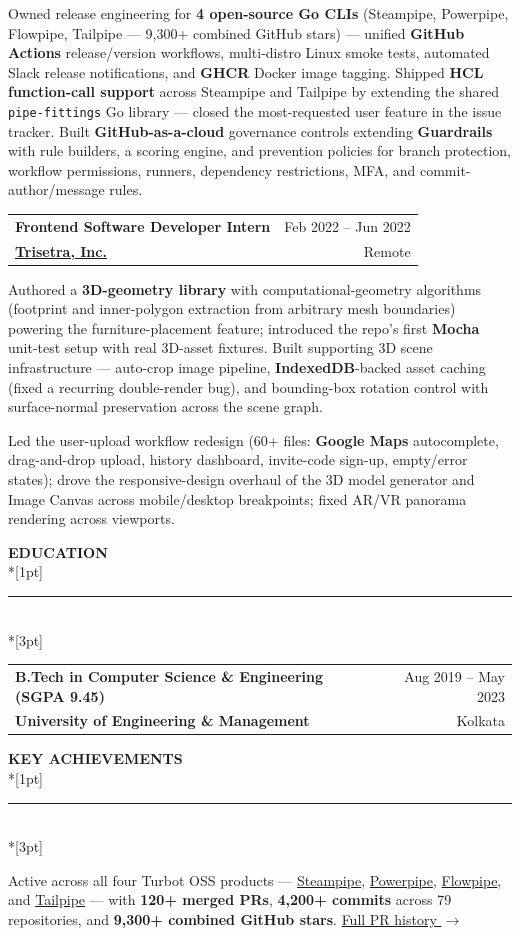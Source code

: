 \documentclass[10pt,letterpaper]{article}
\makeatletter
\newcommand{\rsection}[1]{%
  \vspace{0.85em}%
  {\color{primary}\fontsize{10.5pt}{12pt}\bfseries\selectfont\MakeUppercase{#1}}\\*[1pt]%
  \textcolor{rulec}{\rule{\linewidth}{0.4pt}}\\*[3pt]%
  \nobreak%
}
\newcommand{\role}[4]{%
  \vspace{-4pt}%
  \begin{tabular*}{\linewidth}[t]{@{}l@{\extracolsep{\fill}}r@{}}
    {\fontsize{10pt}{11.5pt}\bfseries\color{header}\selectfont #1} & {\color{muted}\small #4} \\[1pt]
    {\fontsize{9.5pt}{11pt}\bfseries\color{primary}\selectfont #2} & {\color{muted}\small #3} \\
  \end{tabular*}%
  \par\vspace{-4pt}%
}
\let\olditemize\itemize
\let\endolditemize\enditemize
\renewenvironment{itemize}
  {\olditemize\setlength{\itemsep}{2pt}\setlength{\parsep}{0pt}\setlength{\topsep}{1pt}\setlength{\partopsep}{0pt}\setlength{\leftmargin}{1.2em}}
  {\endolditemize}
\makeatother
\begin{document}
\begin{itemize}
\item Owned release engineering for \textbf{4 open-source Go CLIs} (Steampipe, Powerpipe, Flowpipe, Tailpipe --- 9,300+ combined GitHub stars) --- unified \textbf{GitHub Actions} release/version workflows, multi-distro Linux smoke tests, automated Slack release notifications, and \textbf{GHCR} Docker image tagging. Shipped \textbf{HCL function-call support} across Steampipe and Tailpipe by extending the shared \texttt{pipe-fittings} Go library --- closed the most-requested user feature in the issue tracker. Built \textbf{GitHub-as-a-cloud} governance controls extending \textbf{Guardrails} with rule builders, a scoring engine, and prevention policies for branch protection, workflow permissions, runners, dependency restrictions, MFA, and commit-author/message rules.
\end{itemize}

\role{Frontend Software Developer Intern}{\href{https://trisetra.com/}{Trisetra, Inc.}}{Remote}{Feb 2022 -- Jun 2022}
\begin{itemize}
\item Authored a \textbf{3D-geometry library} with computational-geometry algorithms (footprint and inner-polygon extraction from arbitrary mesh boundaries) powering the furniture-placement feature; introduced the repo's first \textbf{Mocha} unit-test setup with real 3D-asset fixtures. Built supporting 3D scene infrastructure --- auto-crop image pipeline, \textbf{IndexedDB}-backed asset caching (fixed a recurring double-render bug), and bounding-box rotation control with surface-normal preservation across the scene graph.

\item Led the user-upload workflow redesign (60+ files: \textbf{Google Maps} autocomplete, drag-and-drop upload, history dashboard, invite-code sign-up, empty/error states); drove the responsive-design overhaul of the 3D model generator and Image Canvas across mobile/desktop breakpoints; fixed AR/VR panorama rendering across viewports.
\end{itemize}

\rsection{Education}
\role{B.Tech in Computer Science \& Engineering \textnormal{\color{muted}\small (SGPA 9.45)}}{University of Engineering \& Management}{Kolkata}{Aug 2019 -- May 2023}

\rsection{Key Achievements}

Active across all four Turbot OSS products --- \href{https://github.com/turbot/steampipe}{Steampipe}, \href{https://github.com/turbot/powerpipe}{Powerpipe}, \href{https://github.com/turbot/flowpipe}{Flowpipe}, and \href{https://github.com/turbot/tailpipe}{Tailpipe} --- with \textbf{120+ merged PRs}, \textbf{4,200+ commits} across 79 repositories, and \textbf{9,300+ combined GitHub stars}. \href{https://github.com/pulls?q=author\%3APriyanka-Chatterjee-2000+is\%3Apr+is\%3Amerged+org\%3Aturbot}{Full PR history $\rightarrow$}
\end{document}
